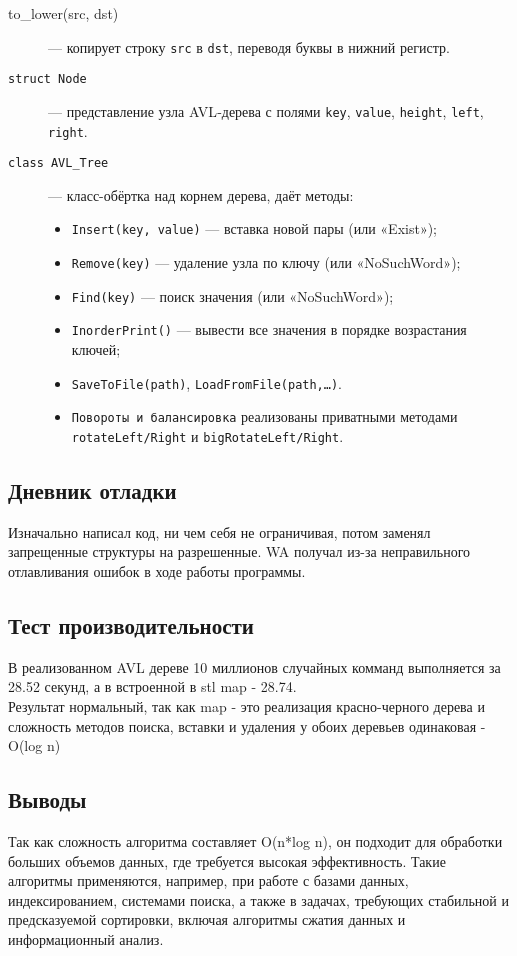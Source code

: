 \documentclass[12pt]{article}
\begin{document}
  \begin{description}
    \item[{to\_lower(src, dst)}] --- копирует строку \texttt{src} в \texttt{dst}, переводя буквы в нижний регистр.
    \item[\texttt{struct Node}] --- представление узла AVL‑дерева с полями \texttt{key}, \texttt{value}, \texttt{height}, \texttt{left}, \texttt{right}.
    \item[\texttt{class AVL\_Tree}] --- класс-обёртка над корнем дерева, даёт методы:
      \begin{itemize}
        \item \texttt{Insert(key, value)} --- вставка новой пары (или «Exist»);
        \item \texttt{Remove(key)} --- удаление узла по ключу (или «NoSuchWord»);
        \item \texttt{Find(key)} --- поиск значения (или «NoSuchWord»);
        \item \texttt{InorderPrint()} --- вывести все значения в порядке возрастания ключей;
        \item \texttt{SaveToFile(path)}, \texttt{LoadFromFile(path,\dots)}.
        \item \texttt{Повороты и балансировка} реализованы приватными методами \texttt{rotateLeft/Right} и \texttt{bigRotateLeft/Right}.
      \end{itemize}
    \end{description}

\subsection*{Дневник отладки}

Изначально написал код, ни чем себя не ограничивая, потом заменял запрещенные структуры на разрешенные. WA получал из-за неправильного отлавливания ошибок в ходе работы программы.

\subsection*{Тест производительности}

В реализованном AVL дереве 10 миллионов случайных комманд выполняется за 28.52 секунд, а в встроенной в stl map - 28.74.\\Результат нормальный, так как map - это реализация красно-черного дерева и сложность методов поиска, вставки и удаления у обоих деревьев одинаковая - O(log n)

\subsection*{Выводы}

Так как сложность алгоритма составляет O(n*log n), он подходит для обработки больших объемов данных, где требуется высокая эффективность. Такие алгоритмы применяются, например, при работе с базами данных, индексированием, системами поиска, а также в задачах, требующих стабильной и предсказуемой сортировки, включая алгоритмы сжатия данных и информационный анализ.
\end{document}
